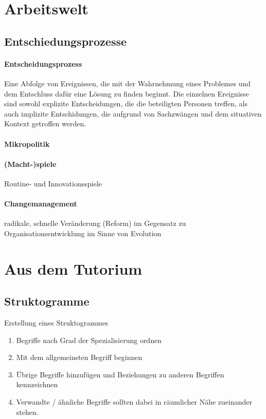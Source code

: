 \section{Arbeitswelt}
\subsection{Entschiedungsprozesse}
\paragraph{Entscheidungsprozess} Eine Abfolge von Ereignissen, die mit der Wahrnehmung eines Problemes und dem Entschluss dafür eine Lösung zu finden beginnt. Die einzelnen Ereignisse sind sowohl explizite Entscheidungen, die die beteiligten Personen treffen, als auch implizite Entschidungen, die aufgrund von Sachzwängen und dem situativen Kontext getroffen werden.
\paragraph{Mikropolitik}
\paragraph{(Macht-)spiele} Routine- und Innovationsspiele
\paragraph{Changemanagement} radikale, schnelle Veränderung (Reform) im Gegensatz zu Organisationsentwicklung im Sinne von Evolution
%
%
%
\section{Aus dem Tutorium}
\subsection{Struktogramme}
Erstellung eines Struktogrammes
\begin{enumerate}
\item Begriffe nach Grad der Spezialisierung ordnen
\item Mit dem allgemeinsten Begriff beginnen
\item Übrige Begriffe hinzufügen und Beziehungen zu anderen Begriffen kennzeichnen
\item Verwandte / ähnliche Begriffe sollten dabei in räumlicher Nähe zueinander stehen.
\end{enumerate}

